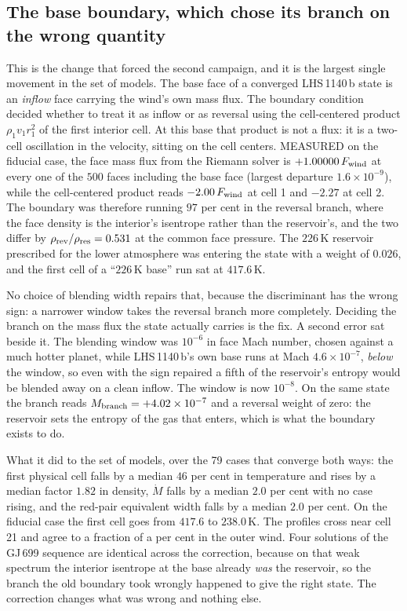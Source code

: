 \documentclass[english,a4paper]{my_memo}
\begin{document}
\subsection{The base boundary, which chose its branch on the wrong quantity}
\label{sec:l21}

This is the change that forced the second campaign, and it is the largest
single movement in the set of models. The base face of a converged
LHS\,1140\,b state is an \emph{inflow} face carrying the wind's own mass
flux. The boundary condition decided whether to treat it as inflow or as
reversal using the cell-centered product $\rho_1 v_1 r_1^2$ of the first
interior cell. At this base that product is not a flux: it is a two-cell
oscillation in the velocity, sitting on the cell centers. MEASURED on the
fiducial case, the face mass flux from the Riemann solver is
$+1.00000\,F_{\rm wind}$ at every one of the $500$ faces including the base
face (largest departure $1.6\times10^{-9}$), while the cell-centered product
reads $-2.00\,F_{\rm wind}$ at cell 1 and $-2.27$ at cell 2. The boundary was
therefore running $97$ per cent in the reversal branch, where the face
density is the interior's isentrope rather than the reservoir's, and the two
differ by $\rho_{\rm rev}/\rho_{\rm res} = 0.531$ at the common face
pressure. The $226$\,K reservoir prescribed for the lower atmosphere was
entering the state with a weight of $0.026$, and the first cell of a
``$226$\,K base'' run sat at $417.6$\,K.

No choice of blending width repairs that, because the discriminant has the
wrong sign: a narrower window takes the reversal branch more completely.
Deciding the branch on the mass flux the state actually carries is the fix. A
second error sat beside it. The blending window was $10^{-6}$ in face Mach
number, chosen against a much hotter planet, while LHS\,1140\,b's own base
runs at Mach $4.6\times10^{-7}$, \emph{below} the window, so even with the
sign repaired a fifth of the reservoir's entropy would be blended away on a
clean inflow. The window is now $10^{-8}$. On the same state the branch reads
$M_{\rm branch} = +4.02\times10^{-7}$ and a reversal weight of zero: the
reservoir sets the entropy of the gas that enters, which is what the boundary
exists to do.

What it did to the set of models, over the 79 cases that converge both ways:
the first physical cell falls by a median $46$ per cent in temperature and
rises by a median factor $1.82$ in density, $\dot M$ falls by a median $2.0$
per cent with no case rising, and the red-pair equivalent width falls by a
median $2.0$ per cent. On the fiducial case the first cell goes from $417.6$
to $238.0$\,K. The profiles cross near cell 21 and agree to a fraction of a
per cent in the outer wind. Four solutions of the GJ\,699 sequence are
identical across the correction, because on that weak spectrum the interior
isentrope at the base already \emph{was} the reservoir, so the branch the old
boundary took wrongly happened to give the right state. The correction
changes what was wrong and nothing else.
\end{document}
